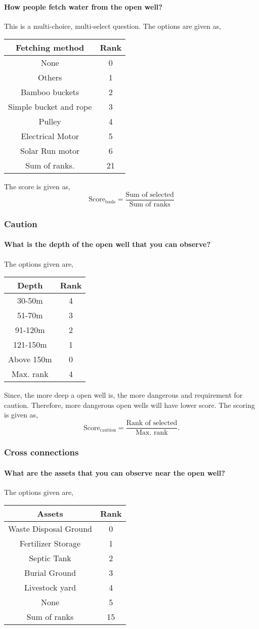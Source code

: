 \documentclass[oneside,twocolumn]{article}
\newcommand{\tsub}[2]{\text{#1}_{\text{#2}}}
\newcommand{\dsub}[2]{\dfrac{\text{#1}}{\text{#2}}}
\newenvironment{ttable}
{
\begin{center}
\begin{tabular}{c|c}
\hline
}
{
\\ \hline
\end{tabular}
\end{center}
}
\begin{document}
\paragraph{How people fetch water from the open well?}
This is a multi-choice, multi-select question. The options are given as,
\begin{ttable}
	Fetching method & Rank \\ \hline
	None & 0 \\
	Others & 1 \\
	Bamboo buckets & 2 \\
	Simple bucket and rope & 3 \\
	Pulley & 4 \\
	Electrical Motor & 5 \\
	Solar Run motor & 6 \\ \hline
	Sum of ranks. & 21
\end{ttable}

The score is given as,
\[
	\tsub{Score}{tools} = \dsub{Sum of selected}{Sum of ranks}
\]

\subsubsection{Caution}
\paragraph{What is the depth of the open well that you can observe?}
The options given are,
\begin{ttable}
	Depth & Rank \\ \hline
	30-50m & 4 \\
	51-70m & 3 \\
	91-120m & 2 \\
	121-150m & 1 \\
	Above 150m & 0 \\ \hline
	Max. rank & 4
\end{ttable}
Since, the more deep a open well is, the more dangerous and requirement for caution. Therefore, more dangerous open wells will have lower score. The scoring is given as,
\[
	\tsub{Score}{caution} = \dsub{Rank of selected}{Max. rank}.
\]
\subsubsection{Cross connections}
\paragraph{What are the assets that you can observe near the open well?}
The options given are,
\begin{ttable}
	Assets & Rank \\ \hline
	Waste Disposal Ground & 0 \\
	Fertilizer Storage & 1 \\
	Septic Tank & 2 \\
	Burial Ground & 3 \\
	Livestock yard & 4 \\
	None & 5 \\ \hline
	Sum of ranks & 15
\end{ttable}
\end{document}
